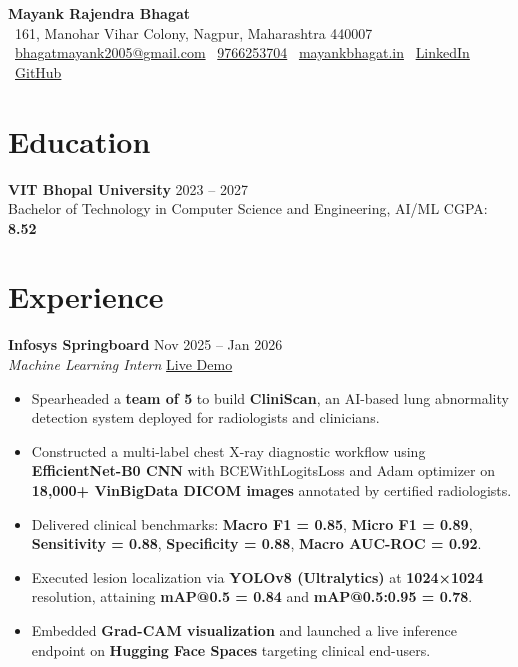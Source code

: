 \documentclass[a4paper,10pt]{article}
\begin{document}

\begin{center}
{\Large \textbf{Mayank Rajendra Bhagat}}\\[2pt]
\small
\faMapMarker* \ 161, Manohar Vihar Colony, Nagpur, Maharashtra 440007\\[2pt]
\faEnvelope\ \href{mailto:bhagatmayank2005@gmail.com}{bhagatmayank2005@gmail.com} \quad
\faPhone\ \href{tel:9766253704}{9766253704} \quad
\faGlobe\ \href{https://mayankbhagat.in/}{mayankbhagat.in} \quad
\faLinkedin\ \href{https://www.linkedin.com/in/mayank-bhagat-8a548b276/}{LinkedIn} \quad
\faGithub\ \href{https://github.com/mayankbhagat}{GitHub}
\end{center}

\section*{Education}

\textbf{VIT Bhopal University} \hfill 2023 -- 2027 \\
Bachelor of Technology in Computer Science and Engineering, AI/ML \hfill CGPA: \textbf{8.52}



\section*{Experience}

\textbf{Infosys Springboard} \hfill Nov 2025 -- Jan 2026 \\
\textit{Machine Learning Intern} \quad
\href{https://huggingface.co/spaces/mayankbhagat/Cliniscan}{Live Demo}
\begin{itemize}[leftmargin=*]
\item Spearheaded a \textbf{team of 5} to build \textbf{CliniScan}, an AI-based lung abnormality detection system deployed for radiologists and clinicians.
\item Constructed a multi-label chest X-ray diagnostic workflow using \textbf{EfficientNet-B0 CNN} with BCEWithLogitsLoss and Adam optimizer on \textbf{18,000+ VinBigData DICOM images} annotated by certified radiologists.
\item Delivered clinical benchmarks: \textbf{Macro F1 = 0.85}, \textbf{Micro F1 = 0.89}, \textbf{Sensitivity = 0.88}, \textbf{Specificity = 0.88}, \textbf{Macro AUC-ROC = 0.92}.
\item Executed lesion localization via \textbf{YOLOv8 (Ultralytics)} at \textbf{1024×1024} resolution, attaining \textbf{mAP@0.5 = 0.84} and \textbf{mAP@0.5:0.95 = 0.78}.
\item Embedded \textbf{Grad-CAM visualization} and launched a live inference endpoint on \textbf{Hugging Face Spaces} targeting clinical end-users.
\end{itemize}
\end{document}
